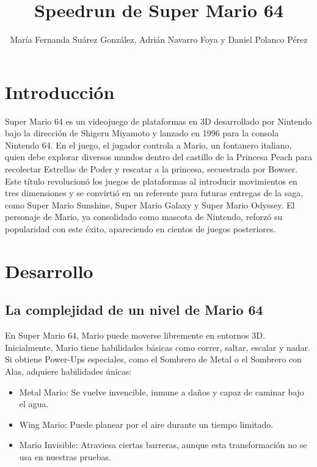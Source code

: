 \documentclass[runningheads]{llncs}
\begin{document}
%



\title{Speedrun de Super Mario 64}
%
%
\author{María Fernanda Suárez González,
Adrián Navarro Foya y 
Daniel Polanco Pérez}
%

%
%
\maketitle              %
%

%
%
\section{Introducción}
Super Mario 64 es un videojuego de plataformas en 3D desarrollado por Nintendo bajo la dirección de Shigeru Miyamoto y lanzado en 1996 para la consola Nintendo 64. 
En el juego, el jugador controla a Mario, un fontanero italiano, quien debe explorar diversos mundos dentro del castillo de la Princesa Peach para recolectar Estrellas de Poder 
y rescatar a la princesa, secuestrada por Bowser. Este título revolucionó los juegos de plataformas al introducir movimientos en tres dimensiones y se convirtió en un 
referente para futuras entregas de la saga, como Super Mario Sunshine, Super Mario Galaxy y Super Mario Odyssey. El personaje de Mario, ya consolidado como mascota de Nintendo,
reforzó su popularidad con este éxito, apareciendo en cientos de juegos posteriores.

\section{Desarrollo}

\subsection{La complejidad de un nivel de Mario 64}
 
En Super Mario 64, Mario puede moverse libremente en entornos 3D. Inicialmente, Mario tiene habilidades básicas como correr, saltar, escalar y nadar. Si obtiene Power-Ups especiales, como el Sombrero de Metal o el Sombrero con Alas, adquiere habilidades únicas:  
\begin{itemize}
\item Metal Mario: Se vuelve invencible, inmune a daños y capaz de caminar bajo el agua.  
\item Wing Mario: Puede planear por el aire durante un tiempo limitado.  
\item Mario Invisible: Atraviesa ciertas barreras, aunque esta transformación no se usa en nuestras pruebas.  
\end{itemize}
\end{document}
